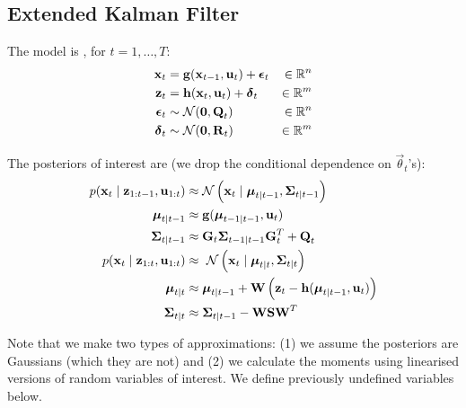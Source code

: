 \subsection{Extended Kalman Filter}
The model is , for $t = 1, \dotsc, T$:
\begin{align}
	\boldsymbol{\mathbf{x}}_t	&= \boldsymbol{\mathbf{g}}(\boldsymbol{\mathbf{x}}_{t - 1}, \boldsymbol{\mathbf{u}}_t) + \boldsymbol{\mathbf{\epsilon}}_t 	&\in \mathbb R^n\\
	\boldsymbol{\mathbf{z}}_t	&= \boldsymbol{\mathbf{h}}(\boldsymbol{\mathbf{x}}_t, \boldsymbol{\mathbf{u}}_t) + \boldsymbol{\mathbf{\delta}}_t 			&\in \mathbb R^m\\
	\boldsymbol{\mathbf{\epsilon}}_t	&\sim \operatorname{\mathcal N}(\boldsymbol{\mathbf{0}}, \boldsymbol{\mathbf{Q}}_t) 						&\in \mathbb R^n\\
	\boldsymbol{\mathbf{\delta}}_t	&\sim \operatorname{\mathcal N}(\boldsymbol{\mathbf{0}}, \boldsymbol{\mathbf{R}}_t) 						&\in \mathbb R^m
\end{align}

The posteriors of interest are (we drop the conditional dependence on $\vec \theta_t$'s):
\begin{align}
	p(\vec x_t \mid \vec z_{1:t - 1}, \vec u_{1:t})	&\approx \Gauss\left(\vec x_t \mid \vec \mu_{t \mid t - 1}, \vec\Sigma_{t \mid t - 1}\right) \\
	\vec \mu_{t \mid t - 1}							&\approx \vec g(\vec \mu_{t - 1 \mid t - 1}, \vec u_t) \\
	\vec \Sigma_{t \mid t - 1}						&\approx \vec G_t \vec \Sigma_{t - 1 \mid t - 1} \vec G_t^T + \vec Q_t \\
	p(\vec x_t \mid \vec z_{1:t}, \vec u_{1:t}) 	&\approx\ \Gauss\left(\vec x_t \mid \vec \mu_{t \mid t}, \vec\Sigma_{t \mid t}\right) \\
	\vec \mu_{t \mid t}								&\approx \vec \mu_{t \mid t - 1} + \vec W \left(\vec z_t - \vec h(\vec \mu_{t \mid t - 1}, \vec u_t)\right) \\
	\vec \Sigma_{t \mid t}							&\approx \vec \Sigma_{t \mid t - 1} - \vec W \vec S \vec W^T
\end{align}

Note that we make two types of approximations: (1) we assume the posteriors are Gaussians (which they are not) and (2) we calculate the moments using linearised versions of random variables of interest. We define previously undefined variables below.

